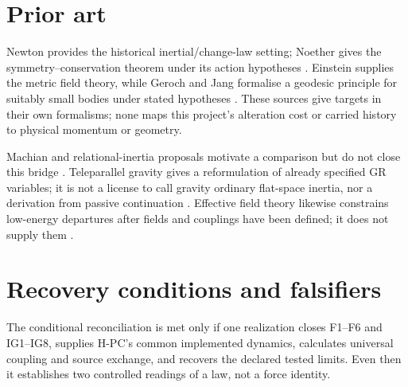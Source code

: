 \documentclass[11pt,a4paper]{article}
\theoremstyle{remark}
\begin{document}
\section{Prior art}\label{sec:priorart}
\begin{sloppypar}
Newton provides the historical inertial/change-law setting; Noether gives the
symmetry--conservation theorem under its action hypotheses \citep{newton1687,noether1918}.
Einstein supplies the metric field theory, while Geroch and Jang formalise a
geodesic principle for suitably small bodies under stated hypotheses
\citep{einstein1916,gerochjang1975}. These sources give targets in their own
formalisms; none maps this project's alteration cost or carried history to
physical momentum or geometry.
\end{sloppypar}

Machian and relational-inertia proposals motivate a comparison but do not close
this bridge \citep{sciama1953,barbourbertotti1977}. Teleparallel gravity gives a
reformulation of already specified GR variables; it is not a license to call
gravity ordinary flat-space inertia, nor a derivation from passive continuation
\citep{aldrovandipereira2013,lisotirioubarrow2011}. Effective field theory
likewise constrains low-energy departures after fields and couplings have been
defined; it does not supply them \citep{donoghue1994,burgess2004}.

\section{Recovery conditions and falsifiers}\label{sec:falsifiers}
The conditional reconciliation is met only if one realization closes F1--F6
and IG1--IG8, supplies H-PC's common implemented dynamics, calculates universal
coupling and source exchange, and recovers the declared tested limits. Even
then it establishes two controlled readings of a law, not a force identity.
\end{document}
